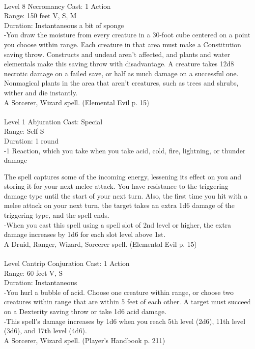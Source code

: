 \documentclass[10pt,twocolumn]{report}
\begin{document}
 \\
Level 8 \quad Necromancy \quad Cast: 1 Action\\
Range: 150 feet \quad V, S, M\\
Duration: Instantaneous \quad a bit of sponge\\
-You draw the moisture from every creature in a 30-foot cube centered on a point you choose within range. Each creature in that area must make a Constitution saving throw. Constructs and undead aren’t affected, and plants and water elementals make this saving throw with disadvantage. A creature takes 12d8 necrotic damage on a failed save, or half as much damage on a successful one. 
Nonmagical plants in the area that aren’t creatures, such as trees and shrubs, wither and die instantly.\\
A Sorcerer, Wizard spell. (Elemental Evil p. 15) \\


 \\
Level 1 \quad Abjuration \quad Cast: Special\\
Range: Self \quad S\\
Duration: 1 round \quad \\
-1 Reaction, which you take when you take acid, cold, fire, lightning, or thunder damage

The spell captures some of the incoming energy, lessening its effect on you and storing it for your next melee attack. You have resistance to the triggering damage type until the start of your next turn. Also, the first time you hit with a melee attack on your next turn, the target takes an extra 1d6 damage of the triggering type, and the spell ends.\\
-When you cast this spell using a spell slot of 2nd level or higher, the extra damage increases by 1d6 for each slot level above 1st.\\
A Druid, Ranger, Wizard, Sorcerer spell. (Elemental Evil p. 15) \\


 \\
Level Cantrip \quad Conjuration \quad Cast: 1 Action\\
Range: 60 feet \quad V, S\\
Duration: Instantaneous \quad \\
-You hurl a bubble of acid. 
Choose one creature within range, or choose two creatures within range that are within 5 feet of each other. A target must succeed on a Dexterity saving throw or take 1d6 acid damage.\\
-This spell’s damage increases by 1d6 when you reach 5th level (2d6), 11th level (3d6), and 17th level (4d6).\\
A Sorcerer, Wizard spell. (Player's Handbook p. 211) \\
\end{document}
